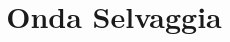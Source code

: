 \documentclass[a4paper,10pt]{article}
\title{Onda Selvaggia}
\author{}
\date{}
\begin{document}
\maketitle

\tableofcontents

\begin{abstract}

\end{abstract}
\end{document}
